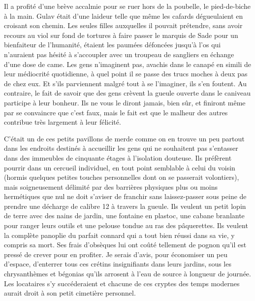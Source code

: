 %
%
Il a profité d’une brève accalmie pour se ruer hors de la poubelle, le pied-de-biche à la main. Gulav était d’une laideur telle que même les cafards dégueulaient en croisant son chemin. Les seules filles auxquelles il pouvait prétendre, sans avoir recours au viol sur fond de tortures à faire passer le marquis de Sade pour un bienfaiteur de l’humanité, étaient les paumées défoncées jusqu’à l’os qui n’auraient pas hésité à s’accoupler avec un troupeau de sangliers en échange d’une dose de came. Les gens n’imaginent pas, avachis dans le canapé en simili de leur médiocrité quotidienne, à quel point il se passe des trucs moches à deux pas de chez eux. Et s’ils parviennent malgré tout à se l’imaginer, ils s’en foutent. Au contraire, le fait de savoir que des gens crèvent la gueule ouverte dans le caniveau participe à leur bonheur. Ils ne vous le diront jamais, bien sûr, et finiront même par se convaincre que c’est faux, mais le fait est que le malheur des autres contribue très largement à leur félicité.

\label{rat:2}%
C’était un de ces petits pavillons de merde comme on en trouve un peu partout dans les endroits destinés à accueillir les gens qui ne souhaitent pas s’entasser dans des immeubles de cinquante étages à l’isolation douteuse. Ils préfèrent pourrir dans un cercueil individuel, en tout point semblable à celui du voisin (hormis quelques petites touches personnelles dont on se passerait volontiers), mais soigneusement délimité par des barrières physiques plus ou moins hermétiques que nul ne doit s’aviser de franchir sans laissez-passer sous peine de prendre une décharge de calibre 12 à travers la gueule. Ils veulent un petit lopin de terre avec des nains de jardin, une fontaine en plastoc, une cabane branlante pour ranger leurs outils et une pelouse tondue au ras des pâquerettes. Ils veulent la complète panoplie du parfait connard qui a tout bien réussi dans sa vie, y compris sa mort. Ses frais d’obsèques lui ont coûté tellement de pognon qu’il est pressé de crever pour en profiter. Je serais d’avis, pour économiser un peu d’espace, d’enterrer tous ces crétins insignifiants dans leurs jardins, sous les chrysanthèmes et bégonias qu’ils arrosent à l’eau de source à longueur de journée. Les locataires s’y succéderaient et chacune de ces cryptes des temps modernes aurait droit à son petit cimetière personnel.

